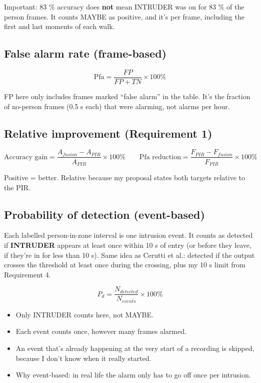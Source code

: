 \documentclass[11pt,a4paper]{article}
\providecommand{\tightlist}{\setlength{\itemsep}{0pt}\setlength{\parskip}{0pt}}
\begin{document}
Important: 83 \% accuracy does
\textbf{not} mean INTRUDER was
on for 83 \% of the person
frames. It counts MAYBE as
positive, and it's per frame,
including the first and last
moments of each walk.

\hypertarget{false-alarm-rate-frame-based}{%
\subsection{False alarm rate
(frame-based)}\label{false-alarm-rate-frame-based}}

\[
\text{Pfa} = \frac{FP}{FP+TN}\times 100\%
\]

FP here only includes frames
marked ``false alarm'' in the
table. It's the fraction of
no-person frames (0.5 s each)
that were alarming, not alarms
per hour.

\hypertarget{relative-improvement-requirement-1}{%
\subsection{Relative
improvement (Requirement
1)}\label{relative-improvement-requirement-1}}

\[
\text{Accuracy gain} = \frac{A_{fusion} - A_{PIR}}{A_{PIR}}\times 100\% \qquad \text{Pfa reduction} = \frac{F_{PIR} - F_{fusion}}{F_{PIR}}\times 100\%
\]

Positive = better. Relative
because my proposal states
both targets relative to the
PIR.

\hypertarget{probability-of-detection-event-based}{%
\subsection{Probability of
detection
(event-based)}\label{probability-of-detection-event-based}}

Each labelled person-in-zone
interval is one intrusion
event. It counts as detected
if \textbf{INTRUDER} appears
at least once within 10 s of
entry (or before they leave,
if they're in for less than 10
s). Same idea as Cerutti et
al.: detected if the output
crosses the threshold at least
once during the crossing, plus
my 10 s limit from Requirement
4.

\[
P_d = \frac{N_{detected}}{N_{events}}\times 100\%
\]

\begin{itemize}
\tightlist
\item
  Only INTRUDER counts here,
  not MAYBE.
\item
  Each event counts once,
  however many frames alarmed.
\item
  An event that's already
  happening at the very start
  of a recording is skipped,
  because I don't know when it
  really started.
\item
  Why event-based: in real
  life the alarm only has to
  go off once per intrusion.
\end{itemize}
\end{document}
